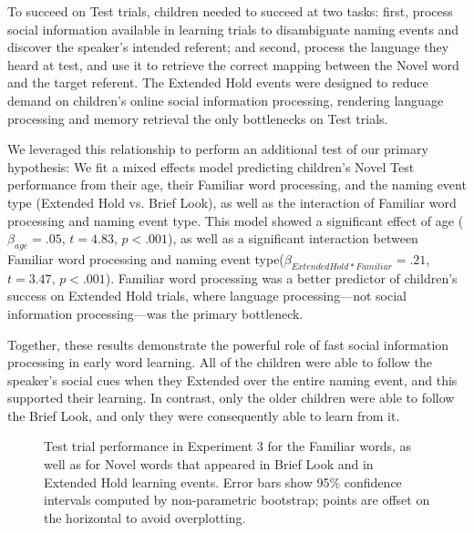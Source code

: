 \documentclass{pnastwo}
\begin{document}
\begin{article}
To succeed on Test trials, children needed to succeed at two tasks: first, process social information available in learning trials to disambiguate naming events and discover the speaker's intended referent; and second, process the language they heard at test, and use it to retrieve the correct mapping between the Novel word and the target referent. The Extended Hold events were designed to reduce demand on children's online social information processing, rendering language processing and memory retrieval the only bottlenecks on Test trials.

We leveraged this relationship to perform an additional test of our primary hypothesis: We fit a mixed effects model predicting children's Novel Test performance from their age, their Familiar word processing, and the naming event type (Extended Hold vs. Brief Look), as well as the interaction of Familiar word processing and naming event type. This model showed a significant effect of age ($\beta_{age} = .05$, $t = 4.83$, $p < . 001$), as well as a significant interaction between Familiar word processing and naming event type($\beta_{Extended Hold * Familiar} = .21$, $t = 3.47$, $p < . 001$). Familiar word processing was a better predictor of children's success on Extended Hold trials, where language processing---not social information processing---was the primary bottleneck.

Together, these results demonstrate the powerful role of fast social information processing in early word learning. All of the children were able to follow the speaker's social cues when they Extended over the entire naming event, and this supported their learning. In contrast, only the older children were able to follow the Brief Look, and only they were consequently able to learn from it.


\begin{figure}[tb]
	\caption{\label{fig:soc_word_test}Test trial performance in Experiment 3 for the Familiar words, as well as for Novel words that appeared in Brief Look and in Extended Hold learning events. Error bars show 95\% confidence intervals computed by non-parametric bootstrap; points are offset on the horizontal to avoid overplotting.}
\end{figure}



\end{article}
\end{document}

